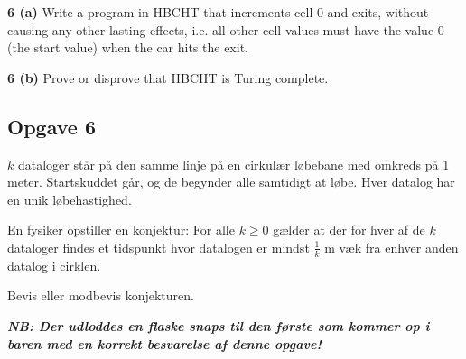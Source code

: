 \noindent\textbf{6 (a)} Write a program in HBCHT that increments cell 0 and
exits, without causing any other lasting effects, i.e. all other cell values
must have the value $0$ (the start value) when the car hits the exit.

\noindent\textbf{6 (b)} Prove or disprove that HBCHT is Turing complete.


\subsection{Opgave 6}

$k$ dataloger står på den samme linje på en cirkulær løbebane med omkreds på 1
meter.  Startskuddet går, og de begynder alle samtidigt at løbe.  Hver datalog
har en unik løbehastighed.

En fysiker opstiller en konjektur: For alle $k \geq 0$ gælder at der for hver af
de $k$ dataloger findes et tidspunkt hvor datalogen er mindst $\frac{1}{k}$ m
væk fra enhver anden datalog i cirklen.

Bevis eller modbevis konjekturen.

\vspace{.1in} \textbf{\emph{NB: Der udloddes en flaske snaps til den første som
    kommer op i baren med en korrekt besvarelse af denne opgave!}}


\setlength{\parindent}{0mm}
